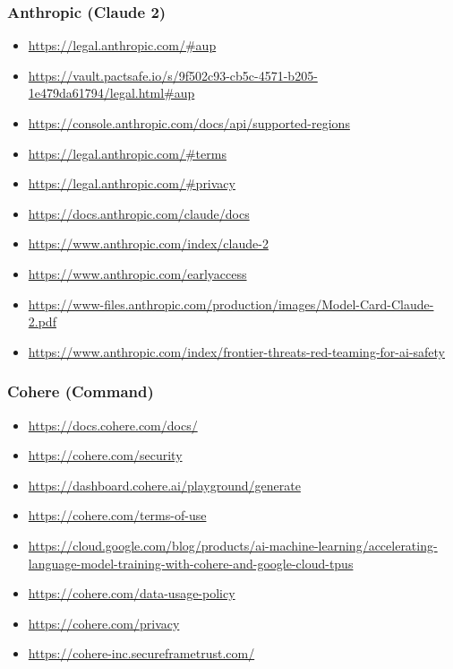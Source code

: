 \subsubsection{Anthropic (Claude 2)}
\begin{itemize}
\item \url{https://legal.anthropic.com/#aup}
\item \url{https://vault.pactsafe.io/s/9f502c93-cb5c-4571-b205-1e479da61794/legal.html#aup}
\item \url{https://console.anthropic.com/docs/api/supported-regions}
\item \url{https://legal.anthropic.com/#terms}
\item \url{https://legal.anthropic.com/#privacy}
\item \url{https://docs.anthropic.com/claude/docs}
\item \url{https://www.anthropic.com/index/claude-2}
\item \url{https://www.anthropic.com/earlyaccess}
\item \url{https://www-files.anthropic.com/production/images/Model-Card-Claude-2.pdf}
\item \url{https://www.anthropic.com/index/frontier-threats-red-teaming-for-ai-safety}
\end{itemize}

\clearpage

\subsubsection{Cohere (Command)}
\begin{itemize}
\item \url{https://docs.cohere.com/docs/}
\item \url{https://cohere.com/security}
\item \url{https://dashboard.cohere.ai/playground/generate}
\item \url{https://cohere.com/terms-of-use}
\item \url{https://cloud.google.com/blog/products/ai-machine-learning/accelerating-language-model-training-with-cohere-and-google-cloud-tpus}
\item \url{https://cohere.com/data-usage-policy}
\item \url{https://cohere.com/privacy}
\item \url{https://cohere-inc.secureframetrust.com/}
\end{itemize}

